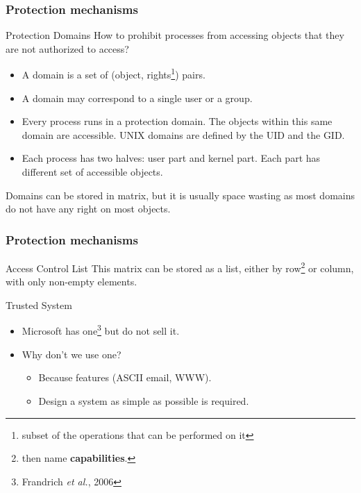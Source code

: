     \begin{frame}
        \frametitle{Protection mechanisms}
        \begin{block}{Protection Domains}
          How to prohibit processes from accessing objects that they are not authorized to access?
          \begin{itemize}
            \item A domain is a set of (object, rights\footnote{subset of the operations that can be performed on it}) pairs.
            \item A domain may correspond to a single user or a group.
            \item Every process runs in a protection domain. The objects within this same domain are accessible. UNIX domains are defined by the UID and the GID.
            \item Each process has two halves: user part and kernel part. Each part has different set of accessible objects.
          \end{itemize}
        \end{block}
        Domains can be stored in matrix, but it is usually space wasting as most domains do not have any right on most objects.
    \end{frame}

    \begin{frame}
        \frametitle{Protection mechanisms}
        \begin{block}{Access Control List}
          This matrix can be stored as a list, either by row\footnote{then name \textbf{capabilities}.} or column, with only non-empty elements.
        \end{block}
        \begin{block}{Trusted System}
          \begin{itemize}
            \item Microsoft has one\footnote{Frandrich \emph{et al.}, 2006} but do not sell it.
            \item Why don't we use one?
            \begin{itemize}
              \item Because features (ASCII email, WWW).
              \item Design a system as simple as possible is required.
            \end{itemize}
          \end{itemize}
        \end{block}
    \end{frame}
